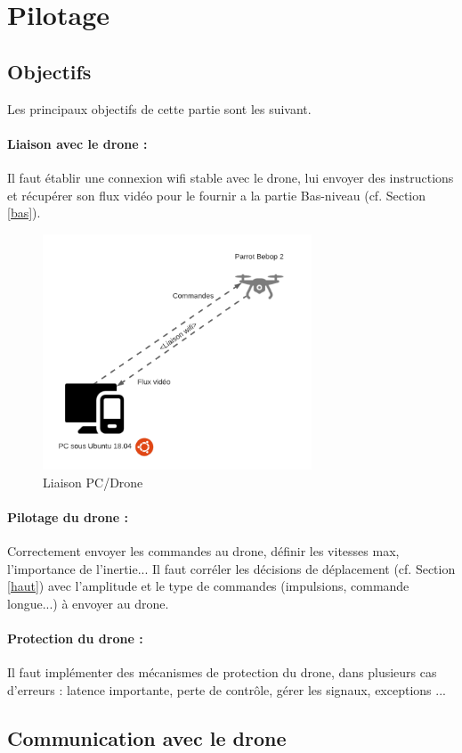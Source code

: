 \documentclass[12pt]{article}
\begin{document}
\section{Pilotage\label{pilotage}}
\subsection{Objectifs}
Les principaux objectifs de cette partie sont les suivant.
\paragraph*{Liaison avec le drone :}
Il faut établir une connexion wifi stable avec le drone, lui envoyer des instructions et récupérer son flux vidéo pour le fournir a la partie Bas-niveau (cf. Section \ref{bas}).

\begin{figure}[H]
\centering
\includegraphics[height=7cm]{PCdrone.png}
\caption{Liaison PC/Drone}
\label{fig:PCdrone}
\end{figure}

\paragraph*{Pilotage du drone :}
Correctement envoyer les commandes au drone, définir les vitesses max, l'importance de l'inertie...
Il faut corréler les décisions de déplacement (cf. Section \ref{haut}) avec l'amplitude et le type de commandes (impulsions, commande longue...) à envoyer au drone.
\paragraph*{Protection du drone :}
Il faut implémenter des mécanismes de protection du drone, dans plusieurs cas d'erreurs : latence importante, perte de contrôle, gérer les signaux, exceptions ...
\subsection{Communication avec le drone}
\end{document}
